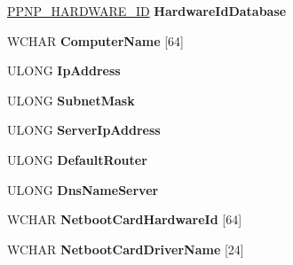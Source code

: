 \begin{DoxyCompactItemize}
\item 
\mbox{\label{struct___s_e_t_u_p___l_o_a_d_e_r___b_l_o_c_k_a8fd6356aab16a38a50828da8793b98a4}} 
\hyperlink{struct___p_n_p___h_a_r_d_w_a_r_e___i_d}{P\+P\+N\+P\+\_\+\+H\+A\+R\+D\+W\+A\+R\+E\+\_\+\+ID} {\bfseries Hardware\+Id\+Database}
\item 
\mbox{\label{struct___s_e_t_u_p___l_o_a_d_e_r___b_l_o_c_k_a252e4a6443e1b56e5c4c2765d9ea516e}} 
W\+C\+H\+AR {\bfseries Computer\+Name} \mbox{[}64\mbox{]}
\item 
\mbox{\label{struct___s_e_t_u_p___l_o_a_d_e_r___b_l_o_c_k_ac68461477157e257c9aecb38fc3d352a}} 
U\+L\+O\+NG {\bfseries Ip\+Address}
\item 
\mbox{\label{struct___s_e_t_u_p___l_o_a_d_e_r___b_l_o_c_k_a92da266aa7a0d14370092e34e7fbe75a}} 
U\+L\+O\+NG {\bfseries Subnet\+Mask}
\item 
\mbox{\label{struct___s_e_t_u_p___l_o_a_d_e_r___b_l_o_c_k_aa8340ea4054646e45a8f09272f280209}} 
U\+L\+O\+NG {\bfseries Server\+Ip\+Address}
\item 
\mbox{\label{struct___s_e_t_u_p___l_o_a_d_e_r___b_l_o_c_k_a2699a7878251d7c9b2cc0be85914baa0}} 
U\+L\+O\+NG {\bfseries Default\+Router}
\item 
\mbox{\label{struct___s_e_t_u_p___l_o_a_d_e_r___b_l_o_c_k_a6dbb73cf6d02f84a34681969db5118f5}} 
U\+L\+O\+NG {\bfseries Dns\+Name\+Server}
\item 
\mbox{\label{struct___s_e_t_u_p___l_o_a_d_e_r___b_l_o_c_k_a5a39a19dc507430db9e7a922c2b37693}} 
W\+C\+H\+AR {\bfseries Netboot\+Card\+Hardware\+Id} \mbox{[}64\mbox{]}
\item 
\mbox{\label{struct___s_e_t_u_p___l_o_a_d_e_r___b_l_o_c_k_a5992f793a14e8bbff7f5e859657e0b0f}} 
W\+C\+H\+AR {\bfseries Netboot\+Card\+Driver\+Name} \mbox{[}24\mbox{]}

\end{DoxyCompactItemize}
